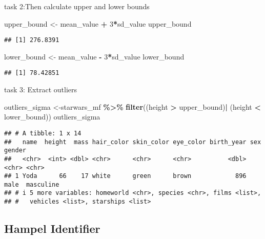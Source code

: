 \documentclass[
]{article}
\newenvironment{Shaded}{\begin{snugshade}}{\end{snugshade}}
\newcommand{\DecValTok}[1]{\textcolor[rgb]{0.00,0.00,0.81}{#1}}
\newcommand{\FunctionTok}[1]{\textcolor[rgb]{0.13,0.29,0.53}{\textbf{#1}}}
\newcommand{\NormalTok}[1]{#1}
\newcommand{\OtherTok}[1]{\textcolor[rgb]{0.56,0.35,0.01}{#1}}
\newcommand{\SpecialCharTok}[1]{\textcolor[rgb]{0.81,0.36,0.00}{\textbf{#1}}}
\begin{document}
task 2:Then calculate upper and lower bounds

\begin{Shaded}
\begin{Highlighting}[]
\NormalTok{upper\_bound }\OtherTok{\textless{}{-}}\NormalTok{ mean\_value }\SpecialCharTok{+} \DecValTok{3}\SpecialCharTok{*}\NormalTok{sd\_value }
\NormalTok{upper\_bound}
\end{Highlighting}
\end{Shaded}

\begin{verbatim}
## [1] 276.8391
\end{verbatim}

\begin{Shaded}
\begin{Highlighting}[]
\NormalTok{lower\_bound }\OtherTok{\textless{}{-}}\NormalTok{ mean\_value }\SpecialCharTok{{-}} \DecValTok{3}\SpecialCharTok{*}\NormalTok{sd\_value }
\NormalTok{lower\_bound}
\end{Highlighting}
\end{Shaded}

\begin{verbatim}
## [1] 78.42851
\end{verbatim}

task 3: Extract outliers

\begin{Shaded}
\begin{Highlighting}[]
\NormalTok{outliers\_sigma }\OtherTok{\textless{}{-}}\NormalTok{starwars\_mf }\SpecialCharTok{\%\textgreater{}\%} \FunctionTok{filter}\NormalTok{((height }\SpecialCharTok{\textgreater{}}\NormalTok{ upper\_bound)}\SpecialCharTok{|}\NormalTok{ (height }\SpecialCharTok{\textless{}}\NormalTok{ lower\_bound)) }
\NormalTok{outliers\_sigma}
\end{Highlighting}
\end{Shaded}

\begin{verbatim}
## # A tibble: 1 x 14
##   name  height  mass hair_color skin_color eye_color birth_year sex   gender   
##   <chr>  <int> <dbl> <chr>      <chr>      <chr>          <dbl> <chr> <chr>    
## 1 Yoda      66    17 white      green      brown            896 male  masculine
## # i 5 more variables: homeworld <chr>, species <chr>, films <list>,
## #   vehicles <list>, starships <list>
\end{verbatim}

\hypertarget{hampel-identifier}{%
\subsection{Hampel Identifier}\label{hampel-identifier}}
\end{document}

